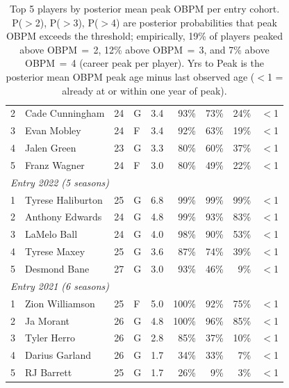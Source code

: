 \begin{table}[htbp]
\begin{tabular}{rlrlrrrrr}
    2 & Cade Cunningham & 24 & G & 3.4 & 93\% & 73\% & 24\% & $<$1 \\
    3 & Evan Mobley & 24 & F & 3.4 & 92\% & 63\% & 19\% & $<$1 \\
    4 & Jalen Green & 23 & G & 3.3 & 80\% & 60\% & 37\% & $<$1 \\
    5 & Franz Wagner & 24 & F & 3.0 & 80\% & 49\% & 22\% & $<$1 \\
    \midrule[0.4pt]
    \multicolumn{9}{l}{\textit{Entry 2022 (5 seasons)}} \\
    \midrule
    1 & Tyrese Haliburton & 25 & G & 6.8 & 99\% & 99\% & 99\% & $<$1 \\
    2 & Anthony Edwards & 24 & G & 4.8 & 99\% & 93\% & 83\% & $<$1 \\
    3 & LaMelo Ball & 24 & G & 4.0 & 98\% & 90\% & 53\% & $<$1 \\
    4 & Tyrese Maxey & 25 & G & 3.6 & 87\% & 74\% & 39\% & $<$1 \\
    5 & Desmond Bane & 27 & G & 3.0 & 93\% & 46\% & 9\% & $<$1 \\
    \midrule[0.4pt]
    \multicolumn{9}{l}{\textit{Entry 2021 (6 seasons)}} \\
    \midrule
    1 & Zion Williamson & 25 & F & 5.0 & 100\% & 92\% & 75\% & $<$1 \\
    2 & Ja Morant & 26 & G & 4.8 & 100\% & 96\% & 85\% & $<$1 \\
    3 & Tyler Herro & 26 & G & 2.8 & 85\% & 37\% & 10\% & $<$1 \\
    4 & Darius Garland & 26 & G & 1.7 & 34\% & 33\% & 7\% & $<$1 \\
    5 & RJ Barrett & 25 & G & 1.7 & 26\% & 9\% & 3\% & $<$1 \\
    \bottomrule
  \end{tabular}
  \caption{Top 5 players by posterior mean peak OBPM per entry cohort. P($>$2), P($>$3), P($>$4) are posterior probabilities that peak OBPM exceeds the threshold; empirically, 19\% of players peaked above OBPM\,$=$\,2, 12\% above OBPM\,$=$\,3, and 7\% above OBPM\,$=$\,4 (career peak per player). Yrs to Peak is the posterior mean OBPM peak age minus last observed age ($<$1 = already at or within one year of peak).}
  \label{tab:breakout_cohort}
\end{table}

